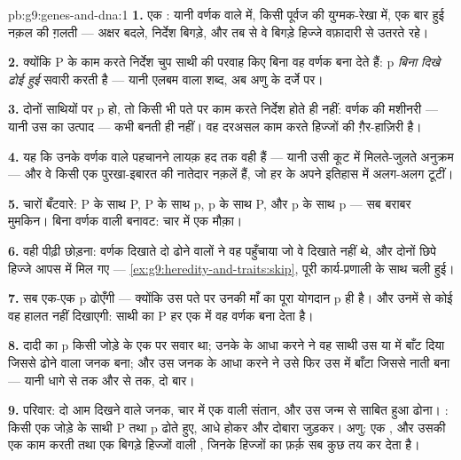 \begin{solution}{pb:g9:genes-and-dna:1}
\textbf{1.} एक : यानी वर्णक वाले  में, किसी पूर्वज की
युग्मक-रेखा में, एक बार हुई नक़ल की ग़लती --- अक्षर बदले, निर्देश बिगड़े,
और तब से वे बिगड़े हिज्जे वफ़ादारी से उतरते रहे।

\textbf{2.} क्योंकि P के काम करते निर्देश चुप साथी की परवाह किए बिना वह
वर्णक बना देते हैं: p \emph{बिना दिखे ढोई हुई} सवारी करती है --- यानी
एलबम वाला शब्द, अब अणु के दर्जे पर।

\textbf{3.} दोनों साथियों पर p हो, तो किसी भी पते पर काम करते निर्देश
होते ही नहीं: वर्णक की मशीनरी --- यानी उस  का उत्पाद --- कभी बनती ही
नहीं। वह  दरअसल काम करते हिज्जों की ग़ैर-हाज़िरी है।

\textbf{4.} यह कि उनके वर्णक वाले  पहचानने लायक़ हद तक वही  हैं
--- यानी उसी कूट में मिलते-जुलते अनुक्रम --- और वे किसी एक पुरखा-इबारत
की नातेदार नक़लें हैं, जो हर  के अपने इतिहास में अलग-अलग टूटीं।

\textbf{5.} चारों बँटवारे: P के साथ P, P के साथ p, p के साथ P, और p के
साथ p --- सब बराबर मुमकिन। बिना वर्णक वाली बनावट: चार में एक मौक़ा।

\textbf{6.} वही पीढ़ी छोड़ना: वर्णक दिखाते दो ढोने वालों ने वह पहुँचाया
जो वे दिखाते नहीं थे, और दोनों छिपे हिज्जे आपस में मिल गए ---
\cref{ex:g9:heredity-and-traits:skip}, पूरी कार्य-प्रणाली के साथ चली
हुई।

\textbf{7.} सब एक-एक p ढोएँगी --- क्योंकि उस पते पर उनकी माँ का पूरा
योगदान p ही है। और उनमें से कोई वह हालत नहीं दिखाएगी: साथी का P हर एक
में वह वर्णक बना देता है।

\textbf{8.} दादी का p किसी जोड़े के एक  पर सवार था; उनके 
के आधा करने ने वह साथी उस  या  में बाँट दिया जिससे ढोने वाला
जनक बना; और उस जनक के आधा करने ने उसे फिर उस  में बाँटा जिससे नाती
बना --- यानी धागे से  तक और  से  तक, दो बार।

\textbf{9.} परिवार: दो आम दिखने वाले जनक, चार में एक वाली संतान, और उस
जन्म से साबित हुआ ढोना। : किसी एक जोड़े के साथी P तथा p ढोते हुए,
आधे होकर और दोबारा जुड़कर। अणु: एक , और उसकी एक काम करती तथा एक बिगड़े
हिज्जों वाली , जिनके हिज्जों का फ़र्क़ सब कुछ तय कर देता है।


\end{solution}
